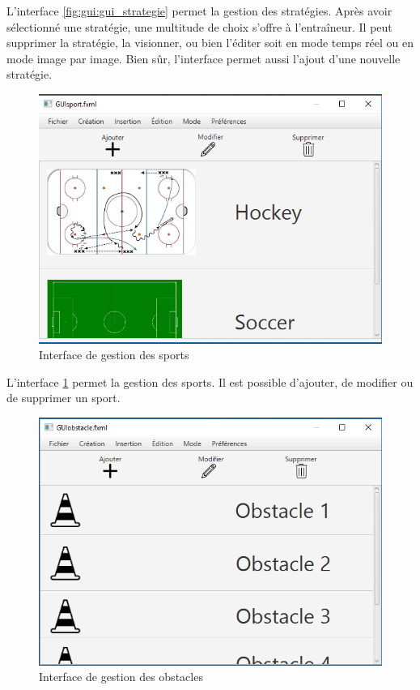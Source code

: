 L'interface \ref{fig:gui:gui_strategie} permet la gestion des stratégies.
Après avoir sélectionné une stratégie, une multitude de choix s'offre à l'entraîneur.
Il peut supprimer la stratégie, la visionner, ou bien l'éditer soit en mode temps réel ou en mode image par image.
Bien sûr, l'interface permet aussi l'ajout d'une nouvelle stratégie.
\newpage

\begin{figure}[htpb]
    \centering
    \includegraphics[scale=0.6]{fig/gui/gui_sport.png}
    \caption{Interface de gestion des sports}
    \label{fig:gui:gui_sport}
\end{figure}

L'interface \ref{fig:gui:gui_sport} permet la gestion des sports.
Il est possible d'ajouter, de modifier ou de supprimer un sport.

\begin{figure}[htpb]
    \centering
    \includegraphics[scale=0.6]{fig/gui/gui_obstacles.png}
    \caption{Interface de gestion des obstacles}
    \label{fig:gui:gui_obstacles}
\end{figure}

